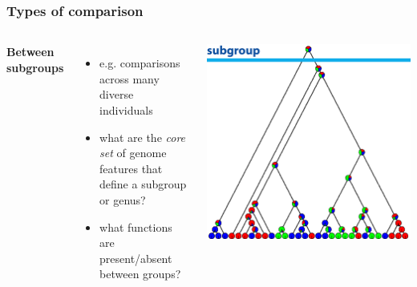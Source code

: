 %
\begin{frame}
  \frametitle{Types of comparison}
    \begin{columns}[T] 
        \textcolor{RawSienna}{\textbf{Between subgroups}}
        \begin{itemize}
          \item e.g. comparisons across many diverse individuals
          \item \textcolor{hutton_green}{what are the \textit{core set} of genome features that define a subgroup or genus?}
          \item \textcolor{hutton_blue}{what functions are present/absent between groups?}
        \end{itemize}
        \includegraphics[width=\textwidth]{images/cladogram_subgroup}
    \end{columns}  
\end{frame}